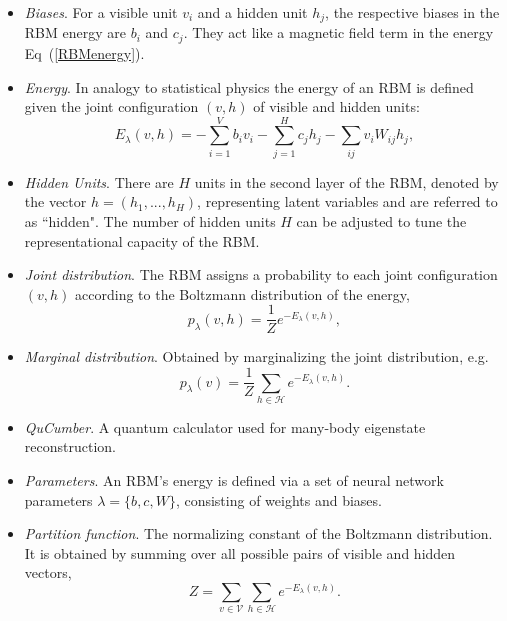 \documentclass[submission, Phys]{SciPost}
\begin{document}
\begin{itemize}

\item {\it Biases}.  For a visible unit $v_i$ and a hidden unit $h_j$, the respective biases in the RBM energy are $b_i$ and $c_j$. They act like a magnetic field term in the energy Eq~(\ref{RBMenergy}).

\item {\it Energy}.  In analogy to statistical physics the energy of an RBM is defined given the joint configuration $(v,h)$ of visible and hidden units:
\begin{equation}
E_{\lambda}(v,h) = - \sum\limits_{i=1}^V b_i v_i - \sum\limits_{j=1}^H c_j h_j - \sum\limits_{ij} v_i W_{ij} h_j, \label{RBMenergy} 
\end{equation}

\item {\it Hidden Units}.  There are $H$ units in the second layer of the RBM, denoted by the vector $h=(h_1, ..., h_H)$, representing latent variables and are referred to as ``hidden".  The number of hidden units $H$ can be adjusted to tune the representational capacity of the RBM.

\item {\it Joint distribution}.  The RBM assigns a probability to each joint configuration $(v,h)$ according to the Boltzmann distribution of the energy,
\begin{equation}
    p_{\lambda}(v,h) = \frac{1}{Z} e^{-E_{\lambda}(v,h)},
\end{equation}

\item {\it Marginal distribution}.  Obtained by marginalizing the joint distribution, e.g.
\begin{equation}
    p_{\lambda}(v) = \frac{1}{Z} \sum\limits_{h\in \mathcal{H}} e^{-E_{\lambda}(v,h)}.
\end{equation}

\item {\it QuCumber}. A quantum calculator used for many-body eigenstate reconstruction.

\item {\it Parameters}.  An RBM's energy is defined via a set of neural network parameters $\lambda = \{b,c,W\}$, consisting of weights and biases.

\item {\it Partition function}. The normalizing constant of the Boltzmann distribution.  It is obtained by summing over all possible pairs of visible and hidden vectors,
\begin{equation}
    Z = \sum\limits_{v\in \mathcal{V}}\sum\limits_{h\in \mathcal{H}} e^{-E_{\lambda}(v,h)}.
\end{equation}


\end{itemize}
\end{document}
